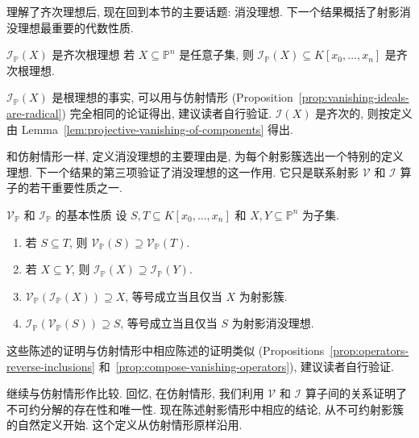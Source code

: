 理解了齐次理想后, 现在回到本节的主要话题: 消没理想. 下一个结果概括了射影消没理想最重要的代数性质.

\begin{Proposition}{$\mathcal{I}_{\mathbb{P}}(X)$ 是齐次根理想}\leavevmode\label{prop:projective-vanishing-ideal-is-homogeneous-radical}
若 $X\subseteq\mathbb{P}^{n}$ 是任意子集, 则 $\mathcal{I}_{\mathbb{P}}(X)\subseteq K[x_{0},\ldots,x_{n}]$ 是齐次根理想.
\end{Proposition}
\begin{Proof}
$\mathcal{I}_{\mathbb{P}}(X)$ 是根理想的事实, 可以用与仿射情形 (Proposition~\ref{prop:vanishing-ideals-are-radical}) 完全相同的论证得出, 建议读者自行验证. $\mathcal{I}(X)$ 是齐次的, 则按定义由 Lemma~\ref{lem:projective-vanishing-of-components} 得出.
\end{Proof}

和仿射情形一样, 定义消没理想的主要理由是, 为每个射影簇选出一个特别的定义理想. 下一个结果的第三项验证了消没理想的这一作用. 它只是联系射影 $\mathcal{V}$ 和 $\mathcal{I}$ 算子的若干重要性质之一.

\begin{Proposition}{$\mathcal{V}_{\mathbb{P}}$ 和 $\mathcal{I}_{\mathbb{P}}$ 的基本性质}\leavevmode\label{prop:basic-properties-of-projective-vanishing-operators}
设 $S,T\subseteq K[x_{0},\ldots,x_{n}]$ 和 $X,Y\subseteq\mathbb{P}^{n}$ 为子集.
\begin{enumerate}
  \item 若 $S\subseteq T$, 则 $\mathcal{V}_{\mathbb{P}}(S)\supseteq\mathcal{V}_{\mathbb{P}}(T)$.
  \item 若 $X\subseteq Y$, 则 $\mathcal{I}_{\mathbb{P}}(X)\supseteq\mathcal{I}_{\mathbb{P}}(Y)$.
  \item $\mathcal{V}_{\mathbb{P}}(\mathcal{I}_{\mathbb{P}}(X))\supseteq X$, 等号成立当且仅当 $X$ 为射影簇.
  \item $\mathcal{I}_{\mathbb{P}}(\mathcal{V}_{\mathbb{P}}(S))\supseteq S$, 等号成立当且仅当 $S$ 为射影消没理想.
\end{enumerate}
\end{Proposition}
\begin{Proof}
这些陈述的证明与仿射情形中相应陈述的证明类似 (Propositions~\ref{prop:operators-reverse-inclusions} 和~\ref{prop:compose-vanishing-operators}), 建议读者自行验证.
\end{Proof}

继续与仿射情形作比较. 回忆, 在仿射情形, 我们利用 $\mathcal{V}$ 和 $\mathcal{I}$ 算子间的关系证明了不可约分解的存在性和唯一性. 现在陈述射影情形中相应的结论, 从不可约射影簇的自然定义开始. 这个定义从仿射情形原样沿用.

